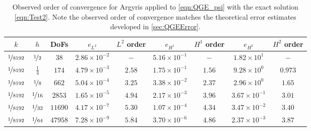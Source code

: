 \begin{table}
\begin{center}
  \begin{tabular}{|c|c|c|c|c|c|c|c|c|}
    \hline
    $k$ & $h$ & DoFs & $e_{L^2}$ & $L^2$ order & $e_{H^1}$ & $H^1$ order & $e_{H^2}$ & $H^2$ order \\
    \hline
    $\nicefrac{1}{8192}$ & $\nicefrac{1}{2}$ & $38$ & $2.86\times 10^{-2}$ & $-$ & $5.16\times 10^{-1}$ & $-$ & $1.82\times 10^{1}$ & $-$ \\
    $\nicefrac{1}{8192}$ & $\frac{1}{4}$ & $174$ & $4.79\times 10^{-3}$ & $2.58$ & $1.75\times 10^{-1}$ & $1.56$ & $9.28\times 10^0$ & $0.973$\\
    $\nicefrac{1}{8192}$ & $\nicefrac{1}{8}$ & $662$ & $5.04\times 10^{-4}$ & $3.25$ & $3.38\times 10^{-2}$ & $2.37$ & $2.96\times 10^0$ & $1.65$\\
    $\nicefrac{1}{8192}$ & $\nicefrac{1}{16}$ & $2853$ & $1.65\times 10^{-5}$ & $4.94$ & $2.17\times 10^{-3}$ & $3.96$ & $3.67\times 10^{-1}$ & $3.01$\\
    $\nicefrac{1}{8192}$ & $\nicefrac{1}{32}$ & $11690$ & $4.17\times 10^{-7}$ & $5.30$ & $1.07\times 10^{-4}$ & $4.34$ & $3.47\times 10^{-2}$ & $3.40$\\
    $\nicefrac{1}{8192}$ &  $\nicefrac{1}{64}$ & $47958$ & $7.28\times 10^{-9}$ & $5.84$ & $3.70\times 10^{-6}$ & $4.86$ & $2.37\times 10^{-3}$ & $3.87$ \\
    \hline
  \end{tabular}
\end{center}
  \caption{Observed order of convergence for Argyris applied to
    \eqref{eqn:QGE_psi} with the exact solution \eqref{eqn:Test2}. Note the observed
    order of convergence matches the theoretical error estimates developed in
    \autoref{sec:QGEError}.}
    \label{tab:Test2Space}
\end{table}


